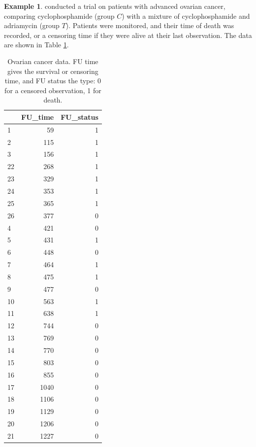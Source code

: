 \documentclass[
  openany]{book}
\theoremstyle{definition}
\theoremstyle{definition}
\newtheorem{example}{Example}[chapter]
\theoremstyle{definition}
\theoremstyle{definition}
\theoremstyle{remark}
\begin{document}
\begin{example}
\protect\hypertarget{exm:surveg1}{}\label{exm:surveg1}\citet{edmonson1979prognosis} conducted a trial on patients with advanced ovarian cancer, comparing cyclophosphamide (group \(C\)) with a mixture of cyclophosphamide and adriamycin (group \(T\)). Patients were monitored, and their time of death was recorded, or a censoring time if they were alive at their last observation. The data are shown in Table \ref{tab:ovdata}.

\begin{table}

\caption{\label{tab:ovdata}Ovarian cancer data. FU time gives the survival or censoring time, and FU status the type: 0 for a censored observation, 1 for death.}
\centering
\begin{tabular}[t]{l|r|r}
\hline
  & FU\_time & FU\_status\\
\hline
1 & 59 & 1\\
\hline
2 & 115 & 1\\
\hline
3 & 156 & 1\\
\hline
22 & 268 & 1\\
\hline
23 & 329 & 1\\
\hline
24 & 353 & 1\\
\hline
25 & 365 & 1\\
\hline
26 & 377 & 0\\
\hline
4 & 421 & 0\\
\hline
5 & 431 & 1\\
\hline
6 & 448 & 0\\
\hline
7 & 464 & 1\\
\hline
8 & 475 & 1\\
\hline
9 & 477 & 0\\
\hline
10 & 563 & 1\\
\hline
11 & 638 & 1\\
\hline
12 & 744 & 0\\
\hline
13 & 769 & 0\\
\hline
14 & 770 & 0\\
\hline
15 & 803 & 0\\
\hline
16 & 855 & 0\\
\hline
17 & 1040 & 0\\
\hline
18 & 1106 & 0\\
\hline
19 & 1129 & 0\\
\hline
20 & 1206 & 0\\
\hline
21 & 1227 & 0\\
\hline
\end{tabular}
\end{table}


\end{example}
\end{document}

